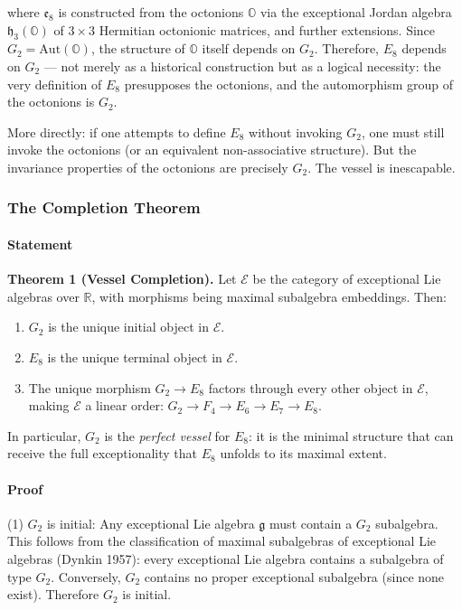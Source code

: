\documentclass[12pt,a4paper]{article}
\begin{document}
where $\mathfrak{e}_8$ is constructed from the octonions $\mathbb{O}$ via the exceptional Jordan algebra $\mathfrak{h}_3(\mathbb{O})$ of $3 \times 3$ Hermitian octonionic matrices, and further extensions. Since $G_2 = \text{Aut}(\mathbb{O})$, the structure of $\mathbb{O}$ itself depends on $G_2$. Therefore, $E_8$ depends on $G_2$ --- not merely as a historical construction but as a logical necessity: the very definition of $E_8$ presupposes the octonions, and the automorphism group of the octonions is $G_2$.

More directly: if one attempts to define $E_8$ without invoking $G_2$, one must still invoke the octonions (or an equivalent non-associative structure). But the invariance properties of the octonions are precisely $G_2$. The vessel is inescapable.

\subsubsection{The Completion Theorem}

\paragraph{Statement}

\textbf{Theorem 1 (Vessel Completion).} Let $\mathcal{E}$ be the category of exceptional Lie algebras over $\mathbb{R}$, with morphisms being maximal subalgebra embeddings. Then:

\begin{enumerate}
    \item $G_2$ is the unique initial object in $\mathcal{E}$.
    \item $E_8$ is the unique terminal object in $\mathcal{E}$.
    \item The unique morphism $G_2 \to E_8$ factors through every other object in $\mathcal{E}$, making $\mathcal{E}$ a linear order: $G_2 \to F_4 \to E_6 \to E_7 \to E_8$.
\end{enumerate}

In particular, $G_2$ is the \emph{perfect vessel} for $E_8$: it is the minimal structure that can receive the full exceptionality that $E_8$ unfolds to its maximal extent.

\paragraph{Proof}

(1) $G_2$ is initial: Any exceptional Lie algebra $\mathfrak{g}$ must contain a $G_2$ subalgebra. This follows from the classification of maximal subalgebras of exceptional Lie algebras (Dynkin 1957): every exceptional Lie algebra contains a subalgebra of type $G_2$. Conversely, $G_2$ contains no proper exceptional subalgebra (since none exist). Therefore $G_2$ is initial.
\end{document}
